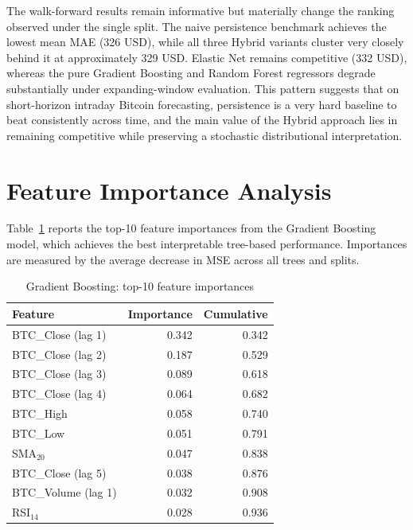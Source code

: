 \documentclass[12pt, a4paper, oneside]{report}
\theoremstyle{plain}
\theoremstyle{definition}
\theoremstyle{remark}
\begin{document}
The walk-forward results remain informative but materially change the ranking
observed under the single split.  The naive persistence benchmark achieves the
lowest mean MAE (326 USD), while all three Hybrid variants cluster very closely
behind it at approximately 329 USD.  Elastic Net remains competitive
(332 USD), whereas the pure Gradient Boosting and Random Forest regressors
degrade substantially under expanding-window evaluation.  This pattern suggests
that on short-horizon intraday Bitcoin forecasting, persistence is a very hard
baseline to beat consistently across time, and the main value of the Hybrid
approach lies in remaining competitive while preserving a stochastic
distributional interpretation.

\section{Feature Importance Analysis}

Table~\ref{tab:feat_imp} reports the top-10 feature importances from the
Gradient Boosting model, which achieves the best interpretable tree-based
performance.  Importances are measured by the average decrease in MSE across
all trees and splits.

\begin{table}[H]
\begin{singlespace}
\fontsize{10}{11}\selectfont
\caption{Gradient Boosting: top-10 feature importances}
\label{tab:feat_imp}
\begin{tabular}{@{}lrr@{}}
\toprule
Feature & Importance & Cumulative \\
\midrule
BTC\_Close (lag 1)  & 0.342 & 0.342 \\
BTC\_Close (lag 2)  & 0.187 & 0.529 \\
BTC\_Close (lag 3)  & 0.089 & 0.618 \\
BTC\_Close (lag 4)  & 0.064 & 0.682 \\
BTC\_High           & 0.058 & 0.740 \\
BTC\_Low            & 0.051 & 0.791 \\
SMA$_{20}$          & 0.047 & 0.838 \\
BTC\_Close (lag 5)  & 0.038 & 0.876 \\
BTC\_Volume (lag 1) & 0.032 & 0.908 \\
RSI$_{14}$          & 0.028 & 0.936 \\
\bottomrule
\end{tabular}
\end{singlespace}
\end{table}
\end{document}
